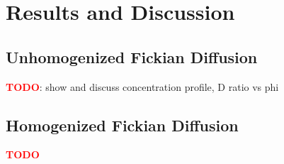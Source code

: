 
\section{Results and Discussion}\label{sec:results}

\subsection{Unhomogenized Fickian Diffusion}\label{subsec:results_unhom_fick}

\textcolor{red}{\textbf{TODO}}: show and discuss concentration profile, D ratio vs phi

\subsection{Homogenized Fickian Diffusion}\label{subsec:results_hom_fick}

\textcolor{red}{\textbf{TODO}}
